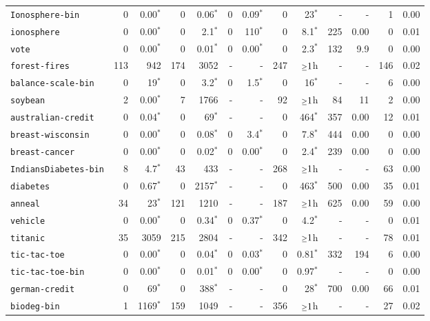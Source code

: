 \begin{tabular}{lrrrrrrrrrrrr}
\texttt{Ionosphere-bin} & 0 & 0.00$^*$ & 0 & 0.06$^*$ & 0 & 0.09$^*$ & 0 & 23$^*$ & - & - & 1 & 0.00\\
\texttt{ionosphere} & 0 & 0.00$^*$ & 0 & 2.1$^*$ & 0 & 110$^*$ & 0 & 8.1$^*$ & 225 & 0.00 & 0 & 0.01\\
\texttt{vote} & 0 & 0.00$^*$ & 0 & 0.01$^*$ & 0 & 0.00$^*$ & 0 & 2.3$^*$ & 132 & 9.9 & 0 & 0.00\\
\texttt{forest-fires} & 113 & 942 & 174 & 3052 & - & - & 247 & $\mathsmaller{\geq}1$h & - & - & 146 & 0.02\\
\texttt{balance-scale-bin} & 0 & 19$^*$ & 0 & 3.2$^*$ & 0 & 1.5$^*$ & 0 & 16$^*$ & - & - & 6 & 0.00\\
\texttt{soybean} & 2 & 0.00$^*$ & 7 & 1766 & - & - & 92 & $\mathsmaller{\geq}1$h & 84 & 11 & 2 & 0.00\\
\texttt{australian-credit} & 0 & 0.04$^*$ & 0 & 69$^*$ & - & - & 0 & 464$^*$ & 357 & 0.00 & 12 & 0.01\\
\texttt{breast-wisconsin} & 0 & 0.00$^*$ & 0 & 0.08$^*$ & 0 & 3.4$^*$ & 0 & 7.8$^*$ & 444 & 0.00 & 0 & 0.00\\
\texttt{breast-cancer} & 0 & 0.00$^*$ & 0 & 0.02$^*$ & 0 & 0.00$^*$ & 0 & 2.4$^*$ & 239 & 0.00 & 0 & 0.00\\
\texttt{IndiansDiabetes-bin} & 8 & 4.7$^*$ & 43 & 433 & - & - & 268 & $\mathsmaller{\geq}1$h & - & - & 63 & 0.00\\
\texttt{diabetes} & 0 & 0.67$^*$ & 0 & 2157$^*$ & - & - & 0 & 463$^*$ & 500 & 0.00 & 35 & 0.01\\
\texttt{anneal} & 34 & 23$^*$ & 121 & 1210 & - & - & 187 & $\mathsmaller{\geq}1$h & 625 & 0.00 & 59 & 0.00\\
\texttt{vehicle} & 0 & 0.00$^*$ & 0 & 0.34$^*$ & 0 & 0.37$^*$ & 0 & 4.2$^*$ & - & - & 0 & 0.01\\
\texttt{titanic} & 35 & 3059 & 215 & 2804 & - & - & 342 & $\mathsmaller{\geq}1$h & - & - & 78 & 0.01\\
\texttt{tic-tac-toe} & 0 & 0.00$^*$ & 0 & 0.04$^*$ & 0 & 0.03$^*$ & 0 & 0.81$^*$ & 332 & 194 & 6 & 0.00\\
\texttt{tic-tac-toe-bin} & 0 & 0.00$^*$ & 0 & 0.01$^*$ & 0 & 0.00$^*$ & 0 & 0.97$^*$ & - & - & 0 & 0.00\\
\texttt{german-credit} & 0 & 69$^*$ & 0 & 388$^*$ & - & - & 0 & 28$^*$ & 700 & 0.00 & 66 & 0.01\\
\texttt{biodeg-bin} & 1 & 1169$^*$ & 159 & 1049 & - & - & 356 & $\mathsmaller{\geq}1$h & - & - & 27 & 0.02\\

\end{tabular}

